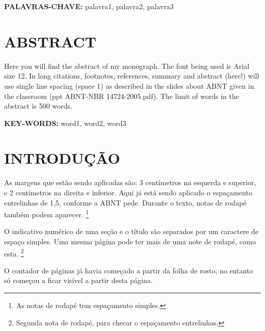 \documentclass[12pt,a4paper]{article}
\begin{document}
	\vspace{0.8cm}
	\textbf{PALAVRAS-CHAVE:} palavra1, palavra2, palavra3

\onehalfspacing

\clearpage %
\thispagestyle{empty} %
\section*{\hfil ABSTRACT} %
	\singlespace
	\noindent
	Here you will find the abstract of my monograph.
	The font being used is Arial size 12.
	In long citations, footnotes, references, summary and abstract (here!) will use single line spacing (space 1) as described in the slides about ABNT given in the classroom (ppt ABNT-NBR 14724-2005.pdf).
	The limit of words in the abstract is 500 words.
	
	\vspace{0.8cm}
	\textbf{KEY-WORDS:} word1, word2, word3

\onehalfspacing

\clearpage %
\thispagestyle{empty} %
\listoffigures %

\clearpage %
\thispagestyle{empty} %
\listoftables %

\clearpage %
\thispagestyle{empty} %
\tableofcontents %

\clearpage %
\section{INTRODUÇÃO}
	As margens que estão sendo aplicadas são: 3 centímetros na esquerda e superior, e 2 centímetros na direita e inferior.
	Aqui já está sendo aplicado o espaçamento entrelinhas de 1,5, conforme a ABNT pede.
	Durante o texto, notas de rodapé também podem aparecer.
	\footnote{As notas de rodapé tem espaçamento simples.}
	
	O indicativo numérico de uma seção e o título são separados por um caractere de espaço simples.
	Uma mesma página pode ter mais de uma note de rodapé, como esta.
	\footnote{Segunda nota de rodapé, para checar o espaçamento entrelinhas.}
	
	O contador de páginas já havia começado a partir da folha de rosto, no entanto só começou a ficar visível a partir desta página.	
	
\end{document}
